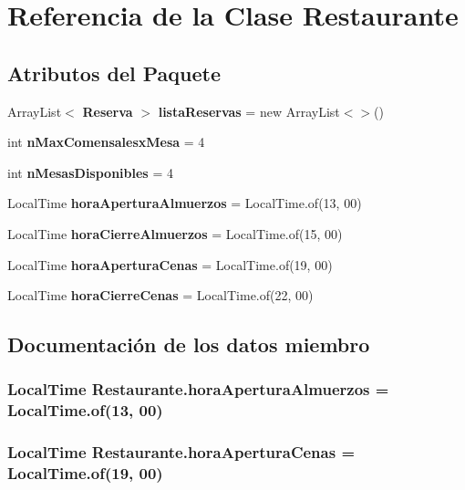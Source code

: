 \section{Referencia de la Clase Restaurante}
\label{class_restaurante}
\subsection*{Atributos del Paquete}
\begin{CompactItemize}
\item 
ArrayList$<$ {\bf Reserva} $>$ {\bf listaReservas} = new ArrayList$<$$>$()
\item 
int {\bf nMaxComensalesxMesa} = 4
\item 
int {\bf nMesasDisponibles} = 4
\item 
LocalTime {\bf horaAperturaAlmuerzos} = LocalTime.of(13, 00)
\item 
LocalTime {\bf horaCierreAlmuerzos} = LocalTime.of(15, 00)
\item 
LocalTime {\bf horaAperturaCenas} = LocalTime.of(19, 00)
\item 
LocalTime {\bf horaCierreCenas} = LocalTime.of(22, 00)
\end{CompactItemize}


\subsection{Documentación de los datos miembro}
\subsubsection[{horaAperturaAlmuerzos}]{\setlength{\rightskip}{0pt plus 5cm}LocalTime {\bf Restaurante.horaAperturaAlmuerzos} = LocalTime.of(13, 00)\hspace{0.3cm}{\tt  [package]}}\label{class_restaurante_09ca9c247c7938a6c2d780474b02e8e8}


\subsubsection[{horaAperturaCenas}]{\setlength{\rightskip}{0pt plus 5cm}LocalTime {\bf Restaurante.horaAperturaCenas} = LocalTime.of(19, 00)\hspace{0.3cm}{\tt  [package]}}\label{class_restaurante_18ed915ad2a0a7f284a9838d009676c6}


